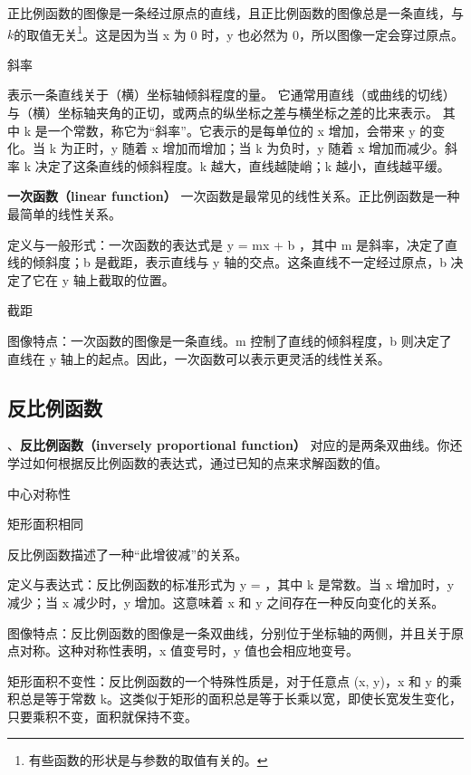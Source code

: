 正比例函数的图像是一条经过原点的直线，且正比例函数的图像总是一条直线，与$k$的取值无关\footnote{有些函数的形状是与参数的取值有关的。}。这是因为当 x 为 0 时，y 也必然为 0，所以图像一定会穿过原点。

\begin{definition}{斜率}

表示一条直线关于（横）坐标轴倾斜程度的量。 它通常用直线（或曲线的切线）与（横）坐标轴夹角的正切，或两点的纵坐标之差与横坐标之差的比来表示。 
其中 k 是一个常数，称它为“斜率”。它表示的是每单位的 x 增加，会带来 y 的变化。当 k 为正时，y 随着 x 增加而增加；当 k 为负时，y 随着 x 增加而减少。斜率 k 决定了这条直线的倾斜程度。k 越大，直线越陡峭；k 越小，直线越平缓。
\end{definition}



\textbf{一次函数（linear function）}
一次函数是最常见的线性关系。正比例函数是一种最简单的线性关系。

定义与一般形式：一次函数的表达式是  y = mx + b ，其中 m 是斜率，决定了直线的倾斜度；b 是截距，表示直线与 y 轴的交点。这条直线不一定经过原点，b 决定了它在 y 轴上截取的位置。
\begin{definition}{截距}

\end{definition}
图像特点：一次函数的图像是一条直线。m 控制了直线的倾斜程度，b 则决定了直线在 y 轴上的起点。因此，一次函数可以表示更灵活的线性关系。

\subsection{反比例函数}

、\textbf{反比例函数（inversely proportional function）}
对应的是两条双曲线。你还学过如何根据反比例函数的表达式，通过已知的点来求解函数的值。

中心对称性

矩形面积相同

反比例函数描述了一种“此增彼减”的关系。

定义与表达式：反比例函数的标准形式为  y =  ，其中 k 是常数。当 x 增加时，y 减少；当 x 减少时，y 增加。这意味着 x 和 y 之间存在一种反向变化的关系。

图像特点：反比例函数的图像是一条双曲线，分别位于坐标轴的两侧，并且关于原点对称。这种对称性表明，x 值变号时，y 值也会相应地变号。

矩形面积不变性：反比例函数的一个特殊性质是，对于任意点 (x, y)，x 和 y 的乘积总是等于常数 k。这类似于矩形的面积总是等于长乘以宽，即使长宽发生变化，只要乘积不变，面积就保持不变。


